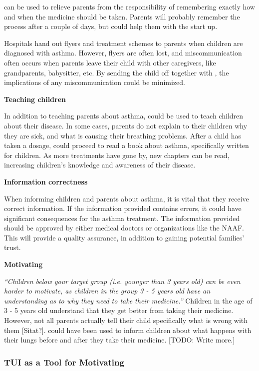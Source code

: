 \buddy{} can be used to relieve parents from the responsibility of remembering exactly how and when the medicine should be taken. Parents will probably remember the process after a couple of days, but \buddy{} could help them with the start up. 

Hospitals hand out flyers and treatment schemes to parents when children are diagnosed with asthma. However, flyers are often lost, and miscommunication often occurs when parents leave their child with other caregivers, like grandparents, babysitter, etc. By sending the child off together with \buddy{}, the implications of any miscommunication could be minimized.    

\textbf{Teaching children}

In addition to teaching parents about asthma, \buddy{} could be used to teach children about their disease. In some cases, parents do not explain to their children why they are sick, and what is causing their breathing problems. After a child has taken a dosage, \buddy{} could proceed to read a book about asthma, specifically written for children. As more treatments have gone by, new chapters can be read, increasing children's knowledge and awareness of their disease.   

\textbf{Information correctness}

When informing children and parents about asthma, it is vital that they receive correct information. If the information provided contains errors, it could have significant consequences for the asthma treatment. The information provided should be approved by either medical doctors or organizations like the NAAF. This will provide a quality assurance, in addition to gaining potential families' trust.    

\textbf{Motivating}

\textit{``Children below your target group (i.e. younger than 3 years old) can be even harder to motivate, as children in the group 3 - 5 years old have an understanding as to why they need to take their medicine.''}
Children in the age of 3 - 5 years old understand that they get better from taking their medicine. However, not all parents actually tell their child specifically what is wrong with them [Sitat?]. \buddy{} could have been used to inform children about what happens with their lungs before and after they take their medicine. 
[TODO: Write more.] 


\subsubsection{TUI as a Tool for Motivating}
\label{sec:tuiasatoolformotivating}

